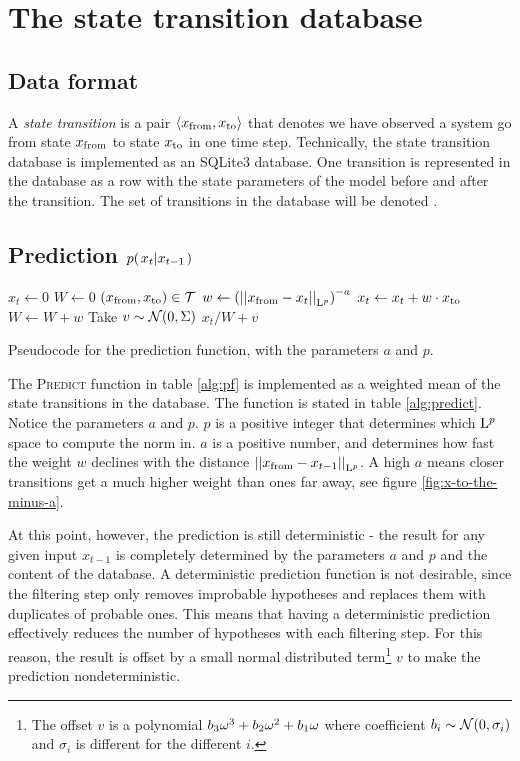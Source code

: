 \section{The state transition database}

\subsection{Data format}
A \emph{state transition} is a pair $\trans$ that denotes we have
observed a system go from state $\tf$ to state $\tt$ in one time
step. Technically, the state transition database is implemented as an
SQLite3 database. One transition is represented in the database as a
row with the state parameters of the model before and after the
transition. The set of transitions in the database will be denoted \TS.

\subsection{Prediction $\cprobnext{x}$}

\begin{table}[h]
  \begin{codebox}
    \li $ x_t \gets 0$
    \li $ W \gets 0$
    \li \ForEach $(\tf, \tt) \in \TS$
    \li \Do
      \li $ w \gets \left(\Lpnorm[p]{\tf - x_t}\right)^{-a}$
      \li $ x_t \gets x_t + w \cdot \tt$
      \li $ W \gets W + w$
    \End
    \li Take $v \sim \ndist{0}{\Sigma}$
    \li \Return $ x_t / W + v $
  \end{codebox}
  \caption{Pseudocode for the prediction function, with the parameters $a$ and $p$.}
  \label{alg:predict}
\end{table}

The \textsc{Predict} function in table \ref{alg:pf} is implemented as
a weighted mean of the state transitions in the database. The function
is stated in table \ref{alg:predict}. Notice the parameters $a$ and
$p$. $p$ is a positive integer that determines which $\Lp$ space to
compute the norm in. $a$ is a positive number, and determines how fast
the weight $w$ declines with the distance $\Lpnorm[p]{\tf -
  x_{t-1}}$. A high $a$ means closer transitions get a much higher
weight than ones far away, see figure \ref{fig:x-to-the-minus-a}.

At this point, however, the prediction is still deterministic - the
result for any given input $x_{t-1}$ is completely determined by the
parameters $a$ and $p$ and the content of the database. A
deterministic prediction function is not desirable, since the
filtering step only removes improbable hypotheses and replaces them
with duplicates of probable ones. This means that having a
deterministic prediction effectively reduces the number of hypotheses
with each filtering step. For this reason, the result is offset by a
small normal distributed term\footnote{The offset $v$ is a polynomial
  $\Spline[b]{\omega}$ where coefficient $b_i \sim \ndist{0}{\sigma_i}
  $ and $\sigma_i$ is different for the different $i$.} $v$ to make
the prediction nondeterministic.

